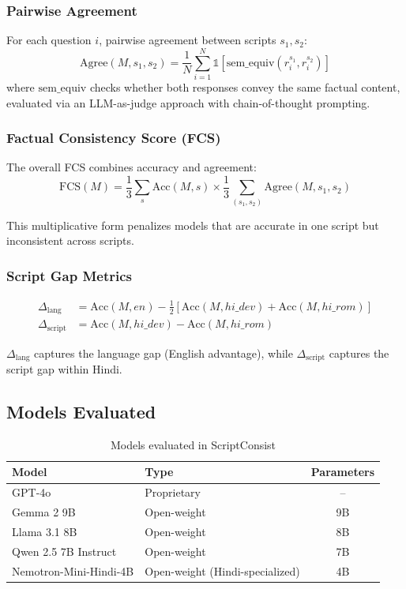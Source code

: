 \documentclass[11pt,a4paper]{article}
\begin{document}
\subsubsection{Pairwise Agreement}
For each question $i$, pairwise agreement between scripts $s_1, s_2$:
\begin{equation}
    \text{Agree}(M, s_1, s_2) = \frac{1}{N} \sum_{i=1}^{N} \mathbb{1}[\text{sem\_equiv}(r_i^{s_1}, r_i^{s_2})]
\end{equation}
where $\text{sem\_equiv}$ checks whether both responses convey the same factual content, evaluated via an LLM-as-judge approach with chain-of-thought prompting.

\subsubsection{Factual Consistency Score (FCS)}
The overall FCS combines accuracy and agreement:
\begin{equation}
    \text{FCS}(M) = \frac{1}{3}\sum_{s} \text{Acc}(M, s) \times \frac{1}{3}\sum_{(s_1, s_2)} \text{Agree}(M, s_1, s_2)
\end{equation}

This multiplicative form penalizes models that are accurate in one script but inconsistent across scripts.

\subsubsection{Script Gap Metrics}
\begin{align}
    \Delta_{\text{lang}} &= \text{Acc}(M, en) - \frac{1}{2}[\text{Acc}(M, hi\_dev) + \text{Acc}(M, hi\_rom)] \\
    \Delta_{\text{script}} &= \text{Acc}(M, hi\_dev) - \text{Acc}(M, hi\_rom)
\end{align}

$\Delta_{\text{lang}}$ captures the language gap (English advantage), while $\Delta_{\text{script}}$ captures the script gap within Hindi.

\subsection{Models Evaluated}

\begin{table}[h]
\centering
\caption{Models evaluated in ScriptConsist}
\label{tab:models}
\begin{tabular}{llc}
\toprule
\textbf{Model} & \textbf{Type} & \textbf{Parameters} \\
\midrule
GPT-4o & Proprietary & -- \\
Gemma 2 9B & Open-weight & 9B \\
Llama 3.1 8B & Open-weight & 8B \\
Qwen 2.5 7B Instruct & Open-weight & 7B \\
Nemotron-Mini-Hindi-4B & Open-weight (Hindi-specialized) & 4B \\
\bottomrule
\end{tabular}
\end{table}
\end{document}
